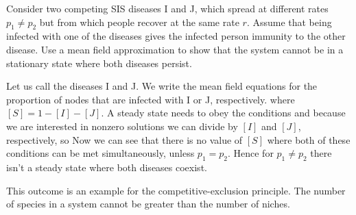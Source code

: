 Consider two competing SIS diseases I and J, which spread at different rates $p_1\neq p_2$ but from which people recover at the same rate $r$. Assume that being infected with one of the diseases gives the infected person immunity to the other disease. Use a mean field approximation to show that the system cannot be in a stationary state where both diseases persist.  

\solution
Let us call the diseases I and J. We write the mean field equations for the proportion of nodes that are infected with I or J, respectively.
where $[S]=1-[I]-[J]$. A steady state needs to obey the conditions
and because we are interested in nonzero solutions we can divide by $[I]$ and $[J]$, respectively, so 
Now we can see that there is no value of $[S]$ where both of these conditions can be met simultaneously, unless $p_1=p_2$. Hence for $p_1\neq p_2$ there isn't a steady state where both diseases coexist. 

This outcome is an example for the competitive-exclusion principle. The number of species in a system cannot be greater than the number of niches. 
